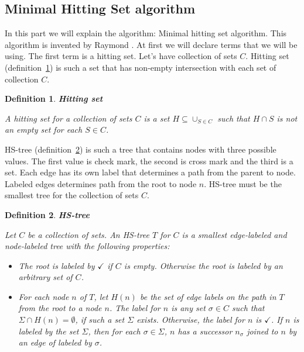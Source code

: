 \documentclass[12pt,a4paper]{article}
\newtheorem{definition}{Definition}[subsection]
\begin{document}
\subsection{Minimal Hitting Set algorithm}
In this part we will explain the algorithm: Minimal hitting set algorithm. This algorithm is invented by Raymond \cite{reiterHS}. At first we will declare terms that we will be using. The first term is a hitting set. Let's have collection of sets $C$. Hitting set (definition~\ref{def:hittingSet}) is such a set that has non-empty intersection with each set of collection $C$.

\begin{definition}{\textbf{Hitting set}}
	\label{def:hittingSet}
	
	A hitting set for a collection of sets $C$ is a set $H \subseteq \cup_{S \in C}$ such that $H \cap S$ is not an empty set for each $S \in C$.
\end{definition}

HS-tree (definition~\ref{def:hsTree}) is such a tree that contains nodes with three possible values. The first value is check mark, the second is cross mark and the third is a set. Each edge has its own label that determines a path from the parent to node. Labeled edges determines path from the root to node $n$. HS-tree must be the smallest tree for the collection of sets $C$.

\newpage
\begin{definition}{\textbf{HS-tree}}
	\label{def:hsTree}
	
	Let $C$ be a collection of sets. An HS-tree $T$ for $C$ is a smallest edge-labeled and node-labeled tree with the following properties:
	
	\begin{itemize}
		\item The root is labeled by $\checkmark$ if $C$ is empty. Otherwise the root is labeled by an arbitrary set of $C$.
		
		\item For each node $n$ of $T$, let $H(n)$ be the set of edge labels on the path in $T$ from the root to a node $n$. The label for $n$ is any set $\sigma \in C$ such that $\Sigma \cap H(n) = \emptyset$, if such a set $\Sigma$ exists. Otherwise, the label for $n$ is $\checkmark$. If $n$ is labeled by the set $\Sigma$, then for each $\sigma \in \Sigma$, $n$ has a successor $n_{\sigma}$ joined to $n$ by an edge of labeled by $\sigma$.
	\end{itemize}
\end{definition}
\end{document}
